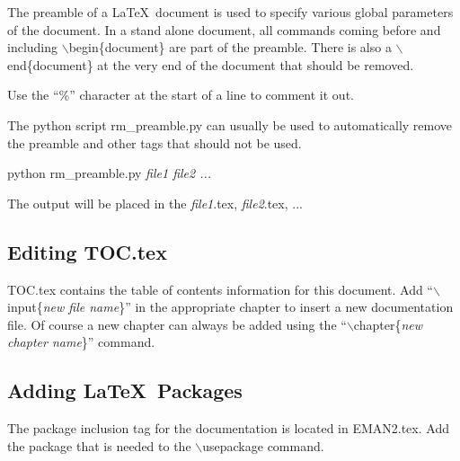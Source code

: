 The preamble of a \LaTeX ~document is used to specify various global
parameters of the document.  In a stand alone document, all commands
coming before and including {\color[named]{BurntOrange}$\backslash$begin\{document\}} are part of the
preamble.  There is also a {\color[named]{BurntOrange}$\backslash$end\{document\}} at the very end
of the document that should be removed.

Use the ``\%'' character at the  start of a line to comment it out.

The python script rm\_preamble.py can usually be used to automatically remove
the preamble and other tags that should not be used.
\begin {itemize}
  {\color[named]{Blue} 
  \item[\%] python rm\_preamble.py \textit{file1 file2 ...}}
\end{itemize}
The output will be placed in the \textit{file1}.tex,
\textit{file2}.tex, ...

\subsection{Editing TOC.tex} \label{ADDING-DOC-TOC}

TOC.tex contains the table of contents information for this document.
Add ``{\color[named]{BurntOrange}$\backslash$input\{\textit{new file name}\}}'' in the appropriate
chapter to insert a new documentation file.
Of course a new chapter can always be added using the
``{\color[named]{BurntOrange}$\backslash$chapter\{\textit{new chapter name}\}}'' command.


\subsection{Adding \LaTeX ~Packages}

The package inclusion tag for the documentation is located in
EMAN2.tex.  Add the package that is needed to the
{\color[named]{BurntOrange}$\backslash$usepackage} command.
